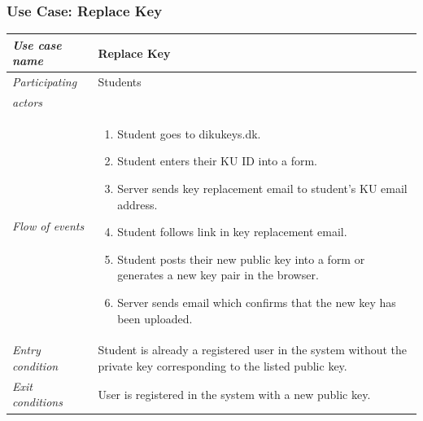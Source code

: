 \documentclass[11pt,a4paper]{report}
\begin{document}
\subsubsection{Use Case: Replace Key}
\begin{tabular}{l p{}}
    \toprule
    \textit{Use case name} & Replace Key \\
    \midrule
    \textit{Participating} & Students \\
    \textit{actors} & \\
    \midrule
    \textit{Flow of events} &
    \vspace{-6.7mm} \begin{enumerate}
        \item Student goes to dikukeys.dk.
        \item Student enters their KU ID into a form.
        \item Server sends key replacement email to student's KU email address.
        \item Student follows link in key replacement email.
        \item Student posts their new public key into a form or generates a new key pair in the browser.
        \item Server sends email which confirms that the new key has been uploaded.
    \end{enumerate}
    \\
    \midrule
    \textit{Entry condition} & Student is already a registered user in the system without the private key corresponding to the listed public key. \\
    \midrule
    \textit{Exit conditions} & User is registered in the system with a new public key. \\
    \bottomrule
\end{tabular}
\end{document}
